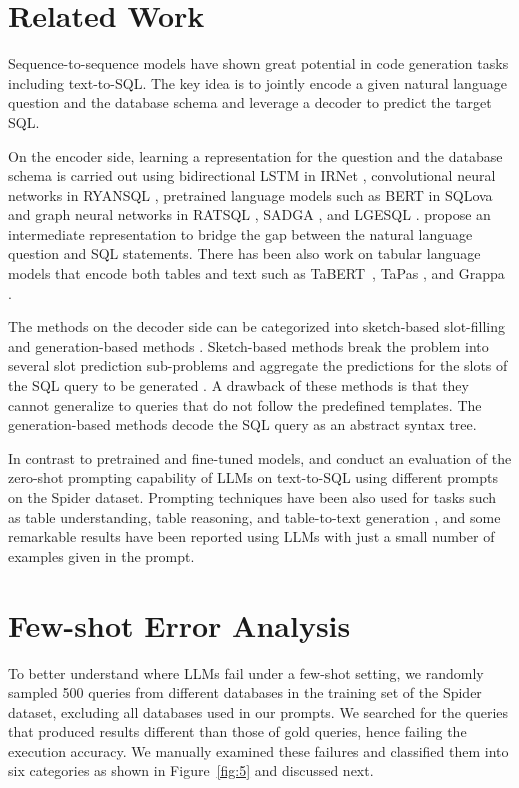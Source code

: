 \section{Related Work}
Sequence-to-sequence models \citep{sutskever2014sequence} have shown great potential in code generation tasks including text-to-SQL. The key idea is to jointly encode a given natural language question and the database schema and leverage a decoder to predict the target SQL.

On the encoder side, learning a representation for the question and the database schema is carried out using bidirectional LSTM in IRNet \citep{graves2012long}, convolutional neural networks in RYANSQL \citep{choi2021ryansql}, pretrained language models such as BERT in SQLova \citep{hwang2019comprehensive} and graph neural networks in RATSQL \citep{wang2019rat}, SADGA \citep{cai2021sadga}, and LGESQL \citep{cao2021lgesql}. 
\citet{gan2021natural} propose an intermediate representation to bridge the gap between the natural language question and SQL statements.
There has been also work on tabular language models that encode both tables and text such as TaBERT~\citep{yin2020tabert}, TaPas \citep{herzig2020tapas}, and Grappa \citep{yu2020grappa}.

The methods on the decoder side can be categorized into sketch-based slot-filling and generation-based methods \citep{qin2022survey}. 
Sketch-based methods break the problem into several slot prediction  sub-problems and aggregate the predictions for the slots of the SQL query to be generated \citep{hwang2019comprehensive, xu2017sqlnet, hui2021improving}. A drawback of these methods is that they cannot generalize to queries that do not follow the predefined templates. The generation-based methods \citep{guo2019towards,wang2019rat,cao2021lgesql,huang2021relation} decode the SQL query as an abstract syntax tree.
 
In contrast to pretrained and fine-tuned models, \citet{rajkumar2022evaluating} and \citet{liu2023comprehensive} conduct an evaluation of the zero-shot prompting capability of LLMs on text-to-SQL using different prompts on the Spider dataset. Prompting techniques have been also used for tasks such as table understanding, table reasoning, and table-to-text generation \citep{guo2023few,chen2022large}, and some remarkable results have been reported using LLMs with just a small number of examples given in the prompt.

\section{Few-shot Error Analysis}
\label{error_analysis}
To better understand where LLMs fail under a few-shot setting, we randomly sampled 500 queries from different databases in the training set of the Spider dataset, excluding all databases used in our prompts. We searched for the queries that produced results different than those of gold queries, hence failing the execution accuracy. We manually examined these failures and classified them into six categories as shown in Figure~\ref{fig:5} and discussed next.

